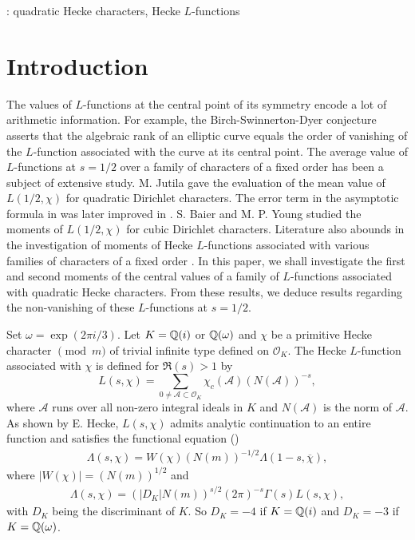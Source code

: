 \documentclass[twoside,leqno,10pt, A4]{amsart}
\begin{document}
: quadratic Hecke characters, Hecke $L$-functions

\section{Introduction}

The values of $L$-functions at the central point of its symmetry encode a lot of arithmetic information.  For example, the Birch-Swinnerton-Dyer conjecture asserts that the algebraic rank of an elliptic curve equals the order of vanishing of the $L$-function associated with the curve at its central point.  The average value of $L$-functions at $s=1/2$ over a family of characters of a fixed order has been a subject of extensive study.  M. Jutila \cite{Jutila} gave the evaluation of the mean value of $L(1/2, \chi)$ for quadratic Dirichlet characters.  The error term in the asymptotic formula in \cite{Jutila} was later improved in \cites{DoHo, MPY, ViTa}.  S. Baier and M. P. Young \cite{B&Y} studied the moments of $L(1/2, \chi)$ for cubic Dirichlet characters.  Literature also abounds in the investigation of moments of Hecke $L$-functions associated with various families of characters of a fixed order \cites{FaHL, GHP, FHL, Luo, Diac, G&Zhao1}.   In this paper, we shall investigate the first and second moments of the central values of a family of $L$-functions associated with quadratic Hecke characters.  From these results, we deduce results regarding the non-vanishing of these $L$-functions at $s=1/2$. \newline

Set $\omega = \exp (2\pi i/3)$.  Let $K =\mathbb Q(i)$ or $\mathbb Q(\omega)$ and $\chi$ be a primitive Hecke character $\pmod {m}$ of trivial infinite type defined on $\mathcal{O}_K$.  The Hecke $L$-function associated
with $\chi$ is defined for $\Re(s) > 1$ by
\begin{equation*}
  L(s, \chi) = \sum_{0 \neq \mathcal{A} \subset
  \mathcal{O}_K}\chi_c(\mathcal{A})(N(\mathcal{A}))^{-s},
\end{equation*}
  where $\mathcal{A}$ runs over all non-zero integral ideals in $K$ and $N(\mathcal{A})$ is the
norm of $\mathcal{A}$. As shown by E. Hecke, $L(s, \chi)$ admits
analytic continuation to an entire function and satisfies the
functional equation (\cite[Theorem 3.8]{HIEK})
\begin{align} \label{1.1}
  \Lambda(s, \chi) = W(\chi)(N(m))^{-1/2}\Lambda(1-s, \overline{\chi}),
\end{align}
   where $|W(\chi)|=(N(m))^{1/2}$ and
\begin{align*}
  \Lambda(s, \chi) = (|D_K|N(m))^{s/2}(2\pi)^{-s}\Gamma(s)L(s, \chi),
\end{align*}
   with $D_K$ being the discriminant of $K$.  So $D_K=-4$ if $K= \mathbb Q(i)$ and $D_K=-3$ if $K=\mathbb Q(\omega)$. \newline
\end{document}
